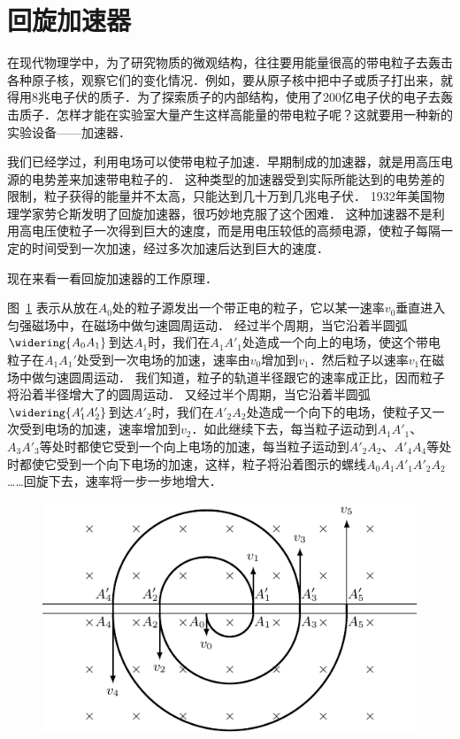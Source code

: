 \section{回旋加速器}


在现代物理学中，为了研究物质的微观结构，往往要用能量很高的带电粒子去轰击各种原子核，观察它们的变化情况．例如，要从原子核中把中子或质子打出来，就得用8兆电子伏的质子．为了探索质子的内部结构，使用了200亿电子伏的电子去轰击质子．怎样才能在实验室大量产生这样高能量的带电粒子呢？这就要用一种新的实验设备——加速器．

我们已经学过，利用电场可以使带电粒子加速．早期制成的加速器，就是用高压电源的电势差来加速带电粒子的．
这种类型的加速器受到实际所能达到的电势差的限制，粒子获得的能量并不太高，只能达到几十万到几兆电子伏．
1932年美国物理学家劳仑斯发明了回旋加速器，很巧妙地克服了这个困难．
这种加速器不是利用高电压使粒子一次得到巨大的速度，而是用电压较低的高频电源，使粒子每隔一定的时间受到一次加速，经过多次加速后达到巨大的速度．

现在来看一看回旋加速器的工作原理．


图~\ref{fig_C_1-39} 表示从放在$A_0$处的粒子源发出一个带正电的粒子，它以某一速率$v_0$垂直进入匀强磁场中，在磁场中做匀速圆周运动．
经过半个周期，当它沿着半圆弧$\widering{A_0A_1}$到达$A_1$时，我们在$A_1A'_1$处造成一个向上的电场，使这个带电粒子在$A_1A_1'$处受到一次电场的加速，速率由$v_0$增加到$v_1$．然后粒子以速率$v_1$在磁场中做匀速圆周运动．
我们知道，粒子的轨道半径跟它的速率成正比，因而粒子将沿着半径增大了的圆周运动．
又经过半个周期，当它沿着半圆弧$\widering{A'_1A'_2}$到达$A'_2$时，我们在$A'_2A_2$处造成一个向下的电场，使粒子又一次受到电场的加速，速率增加到$v_2$．如此继续下去，每当粒子运动到$A_1A'_1$、$A_3A'_3$等处时都使它受到一个向上电场的加速，每当粒子运动到$A'_2A_2$、$A'_4A_4$等处时都使它受到一个向下电场的加速，这样，粒子将沿着图示的螺线$A_0A_1A'_1A'_2A_2$……回旋下去，速率将一步一步地增大．

\begin{figure}[htbp]
	\centering
	\includegraphics{fig/C/1-39.pdf}
	\caption{}\label{fig_C_1-39}
\end{figure}




